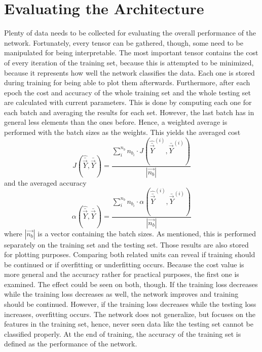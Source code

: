 \section{Evaluating the Architecture}
\label{sec:methods-evaluate}
Plenty of data needs to be collected for evaluating the overall performance of the network.
Fortunately, every tensor can be gathered, though, some need to be manipulated for being interpretable.
The most important tensor contains the cost of every iteration of the training set, because this is attempted to be minimized, because it represents how well the network classifies the data.
Each one is stored during training for being able to plot them afterwards.
Furthermore, after each epoch the cost and accuracy of the whole training set and the whole testing set are calculated with current parameters.
This is done by computing each one for each batch and averaging the results for each set.
However, the last batch has in general less elements than the ones before.
Hence, a weighted average is performed with the batch sizes as the weights.
This yields the averaged cost
\begin{equation}
	J\left(\hat{\bar{\vec{Y}}}, \bar{\vec{Y}}\right) =  \frac{\sum_{i}^{n_b} n_{b_i} \cdot J\left(\hat{\bar{\vec{Y}}}^{(i)}, \bar{\vec{Y}}^{(i)}\right)}{\left|\vec{n_b}\right|}
\end{equation}
and the averaged accuracy
\begin{equation}
	\alpha\left(\hat{\bar{\vec{Y}}}, \bar{\vec{Y}}\right) =  \frac{\sum_{i}^{n_b} n_{b_i} \cdot \alpha\left(\hat{\bar{\vec{Y}}}^{(i)}, \bar{\vec{Y}}^{(i)}\right)}{\left|\vec{n_b}\right|}
\end{equation}
where $|\vec{n_b}|$ is a vector containing the batch sizes.
As mentioned, this is performed separately on the training set and the testing set.
Those results are also stored for plotting purposes.
Comparing both related units can reveal if training should be continued or if overfitting or underfitting occurs.
Because the cost value is more general and the accuracy rather for practical purposes, the first one is examined.
The effect could be seen on both, though.
If the training loss decreases while the training loss decreases as well, the network improves and training should be continued.
However, if the training loss decreases while the testing loss increases, overfitting occurs.
The network does not generalize, but focuses on the features in the training set, hence, never seen data like the testing set cannot be classified properly.
At the end of training, the accuracy of the training set is defined as the performance of the network.
